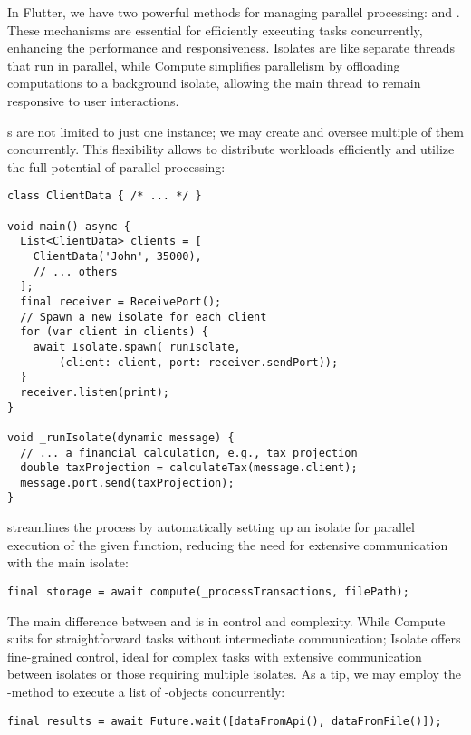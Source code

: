 In Flutter, we have two powerful methods for managing parallel processing:  and . These 
mechanisms are essential for efficiently executing tasks concurrently, enhancing the performance and responsiveness. 
Isolates are like separate threads that run in parallel, while Compute simplifies parallelism by offloading 
computations to a background isolate, allowing the main thread to remain responsive to user interactions.

s are not limited to just one instance; we may create and oversee multiple of them concurrently. This 
flexibility allows to distribute workloads efficiently and utilize the full potential of parallel processing:

\begin{lstlisting}
class ClientData { /* ... */ }

void main() async {
  List<ClientData> clients = [
    ClientData('John', 35000), 
    // ... others
  ];
  final receiver = ReceivePort();
  // Spawn a new isolate for each client
  for (var client in clients) {
    await Isolate.spawn(_runIsolate,
        (client: client, port: receiver.sendPort));
  }
  receiver.listen(print);
}

void _runIsolate(dynamic message) {
  // ... a financial calculation, e.g., tax projection
  double taxProjection = calculateTax(message.client);
  message.port.send(taxProjection);
}
\end{lstlisting}

\noindent {} streamlines the process by automatically setting up an isolate for parallel execution of the 
given function, reducing the need for extensive communication with the main isolate:

\begin{lstlisting}
final storage = await compute(_processTransactions, filePath);
\end{lstlisting}

\noindent The main difference between  and  is in control and complexity. While Compute suits 
for straightforward tasks without intermediate communication; Isolate offers fine-grained control, ideal for complex 
tasks with extensive communication between isolates or those requiring multiple isolates. As a tip, we may employ the 
-method to execute a list of -objects concurrently:

\begin{lstlisting}
final results = await Future.wait([dataFromApi(), dataFromFile()]);
\end{lstlisting}

